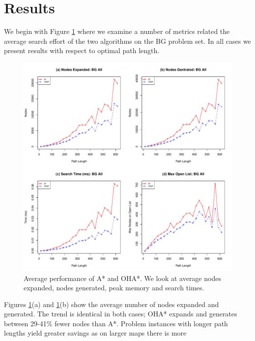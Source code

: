 \section{Results}
\label{sec-results}
We begin with Figure \ref{fig-searcheffort} where we examine a number of metrics
related the average search effort of the two algorithms on the BG problem set.
In all cases we present results with respect to optimal path length.
\begin{figure}[htbp]
	\vspace{-2pt}
	\begin{center}
		       \includegraphics[scale=0.48, trim = 20mm 17mm 20mm 5mm]{diagrams/bg_effort.pdf}
	\end{center}
	\caption{Average performance of A* and OHA*. We look at average nodes expanded, nodes generated,
	peak memory and search times.}
	\label{fig-searcheffort}
	\vspace{-12pt}
\end{figure}
\par \indent
Figures \ref{fig-searcheffort}(a) and \ref{fig-searcheffort}(b)  show the average number of 
nodes expanded and generated. 
The trend is identical in both cases; OHA* expands and generates between 29-41\% fewer nodes than A*.
Problem instances with longer path lengths yield greater savings as on larger maps there is more 
